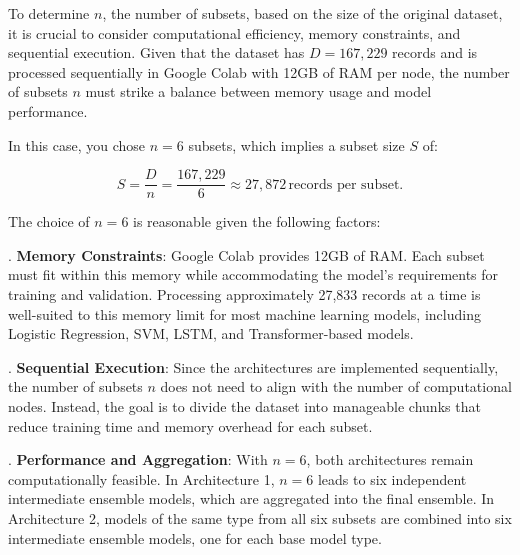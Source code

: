 \vspace{1em}

\noindent
To determine \( n \), the number of subsets, based on the size of the original dataset, it is crucial to consider computational efficiency, memory constraints, and sequential execution. Given that the dataset has \( D = 167,229 \) records and is processed sequentially in Google Colab with 12GB of RAM per node, the number of subsets \( n \) must strike a balance between memory usage and model performance.

\vspace{1em}

\noindent
In this case, you chose \( n = 6 \) subsets, which implies a subset size \( S \) of:

\[
S = \frac{D}{n} = \frac{167,229}{6} \approx 27,872 \, \text{records per subset}.
\]

\vspace{1em}

\noindent
The choice of \( n = 6 \) is reasonable given the following factors:

\vspace{1em}

. \textbf{Memory Constraints}: Google Colab provides 12GB of RAM. Each subset must fit within this memory while accommodating the model's requirements for training and validation. Processing approximately 27,833 records at a time is well-suited to this memory limit for most machine learning models, including Logistic Regression, SVM, LSTM, and Transformer-based models.

\vspace{1em}

. \textbf{Sequential Execution}: Since the architectures are implemented sequentially, the number of subsets \( n \) does not need to align with the number of computational nodes. Instead, the goal is to divide the dataset into manageable chunks that reduce training time and memory overhead for each subset.

\vspace{1em}

. \textbf{Performance and Aggregation}: With \( n = 6 \), both architectures remain computationally feasible. In Architecture 1, \( n = 6 \) leads to six independent intermediate ensemble models, which are aggregated into the final ensemble. In Architecture 2, models of the same type from all six subsets are combined into six intermediate ensemble models, one for each base model type.


